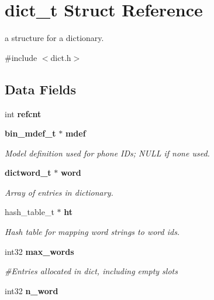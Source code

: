 \section{dict\+\_\+t Struct Reference}
\label{structdict__t}


a structure for a dictionary.  




{\ttfamily \#include $<$dict.\+h$>$}

\subsection*{Data Fields}
\begin{DoxyCompactItemize}
\item 
int {\bfseries refcnt}\label{structdict__t_a5fab69be1205a6c84ec93a4b08924d3c}

\item 
{\bf bin\+\_\+mdef\+\_\+t} $\ast$ {\bf mdef}\label{structdict__t_a3a01eb5a3ebda5652d434be26e0cfdd2}

\begin{DoxyCompactList}\small\item\em Model definition used for phone I\+Ds; N\+U\+L\+L if none used. \end{DoxyCompactList}\item 
{\bf dictword\+\_\+t} $\ast$ {\bf word}\label{structdict__t_a9e6636bbe45936a03381fea430addd31}

\begin{DoxyCompactList}\small\item\em Array of entries in dictionary. \end{DoxyCompactList}\item 
hash\+\_\+table\+\_\+t $\ast$ {\bf ht}\label{structdict__t_a7205aae4fbeef3aaa53f94b6af529af2}

\begin{DoxyCompactList}\small\item\em Hash table for mapping word strings to word ids. \end{DoxyCompactList}\item 
int32 {\bf max\+\_\+words}\label{structdict__t_af6142600cef73f846b58ba9bc36b02ac}

\begin{DoxyCompactList}\small\item\em \#\+Entries allocated in dict, including empty slots \end{DoxyCompactList}\item 
int32 {\bf n\+\_\+word}\label{structdict__t_af00f60319a7025361e291af5addb6b31}


\end{DoxyCompactItemize}
